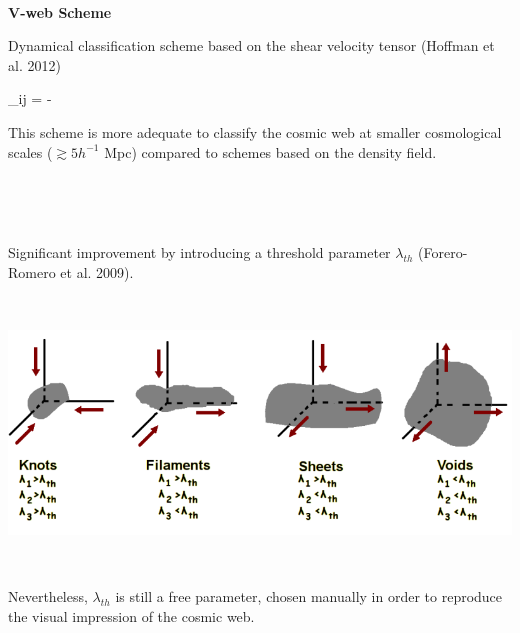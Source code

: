 \documentclass[8pt,fleqn]{beamer}
\begin{document}
\begin{frame}
\begin{tcolorbox}[colback=white!5,colframe=black!75!black,title=Classification of the Cosmic Web]\justifying
\

	\textbf{V-web Scheme}

	Dynamical classification scheme based on the shear velocity tensor 
	(Hoffman et al. 2012)
	
	{\Sigma_{ij} = -   }

	This scheme is more adequate to classify the cosmic web at smaller 
	cosmological scales ($\gtrsim 5h^{-1}$ Mpc) compared to schemes based 
	on the density field.

\

\end{tcolorbox}
\end{frame}
\begin{frame}
\begin{tcolorbox}[colback=white!5,colframe=black!75!black,title=Classification of the Cosmic Web]\justifying

\

	Significant improvement by introducing a threshold parameter 
	$\lambda_{th}$ (Forero-Romero et al. 2009).

	\
	\begin{center}
	\includegraphics[trim = 0mm 0mm 0mm 0mm, clip, width=.9\textwidth]
	{./figures/EnvironmentClassification.png}
	\end{center}
	\
	
	Nevertheless, $\lambda_{th}$ is still a free parameter,	chosen 
	manually in order to reproduce the visual impression of the cosmic 
	web. 
	

\

\end{tcolorbox}
\end{frame}
\end{document}
